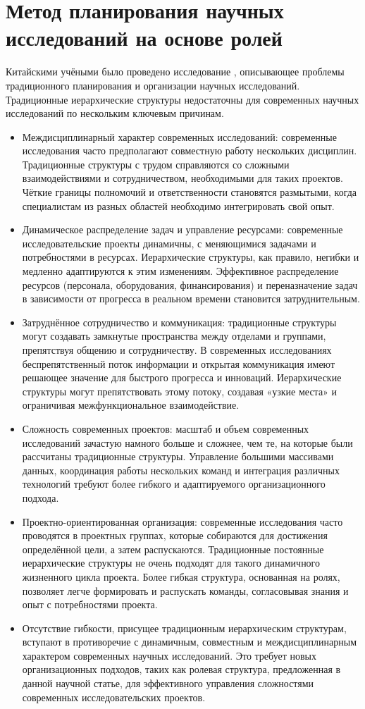 \chapter{Метод планирования научных исследований на основе ролей}

Китайскими учёными было проведено исследование \cite{china}, описывающее проблемы традиционного планирования и организации научных исследований. Традиционные иерархические структуры недостаточны для современных научных исследований по нескольким ключевым причинам.
\begin{itemize}[label*=---]
	\item Междисциплинарный характер современных исследований: современные исследования часто предполагают совместную работу нескольких дисциплин. Традиционные структуры с трудом справляются со сложными взаимодействиями и сотрудничеством, необходимыми для таких проектов. Чёткие границы полномочий и ответственности становятся размытыми, когда специалистам из разных областей необходимо интегрировать свой опыт.
	\item Динамическое распределение задач и управление ресурсами: современные исследовательские проекты динамичны, с меняющимися задачами и потребностями в ресурсах. Иерархические структуры, как правило, негибки и медленно адаптируются к этим изменениям. Эффективное распределение ресурсов (персонала, оборудования, финансирования) и переназначение задач в зависимости от прогресса в реальном времени становится затруднительным.
	\item Затруднённое сотрудничество и коммуникация: традиционные структуры могут создавать замкнутые пространства между отделами и группами, препятствуя общению и сотрудничеству. В современных исследованиях беспрепятственный поток информации и открытая коммуникация имеют решающее значение для быстрого прогресса и инноваций. Иерархические структуры могут препятствовать этому потоку, создавая «узкие места» и ограничивая межфункциональное взаимодействие.
	\item Сложность современных проектов: масштаб и объем современных исследований зачастую намного больше и сложнее, чем те, на которые были рассчитаны традиционные структуры. Управление большими массивами данных, координация работы нескольких команд и интеграция различных технологий требуют более гибкого и адаптируемого организационного подхода.
	\item Проектно-ориентированная организация: современные исследования часто проводятся в проектных группах, которые собираются для достижения определённой цели, а затем распускаются. Традиционные постоянные иерархические структуры не очень подходят для такого динамичного жизненного цикла проекта. Более гибкая структура, основанная на ролях, позволяет легче формировать и распускать команды, согласовывая знания и опыт с потребностями проекта.
	\item Отсутствие гибкости, присущее традиционным иерархическим структурам, вступают в противоречие с динамичным, совместным и междисциплинарным характером современных научных исследований. Это требует новых организационных подходов, таких как ролевая структура, предложенная в данной научной статье, для эффективного управления сложностями современных исследовательских проектов.
\end{itemize}

